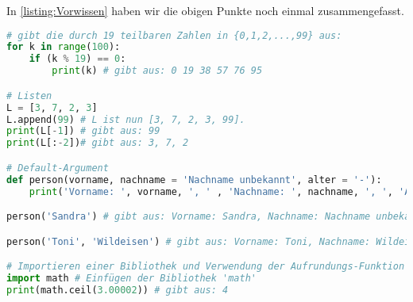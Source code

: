 In \cref{listing:Vorwissen} haben wir die obigen Punkte noch einmal zusammengefasst.
\begin{lstlisting}[language=Python,caption=Vorwissen Python,label=listing:Vorwissen]
# gibt die durch 19 teilbaren Zahlen in {0,1,2,...,99} aus:
for k in range(100):
    if (k % 19) == 0:
        print(k) # gibt aus: 0 19 38 57 76 95

# Listen
L = [3, 7, 2, 3]
L.append(99) # L ist nun [3, 7, 2, 3, 99].
print(L[-1]) # gibt aus: 99
print(L[:-2])# gibt aus: 3, 7, 2

# Default-Argument
def person(vorname, nachname = 'Nachname unbekannt', alter = '-'):
    print('Vorname: ', vorname, ', ' , 'Nachname: ', nachname, ', ', 'Alter: ', alter, sep='')

person('Sandra') # gibt aus: Vorname: Sandra, Nachname: Nachname unbekannt, Alter: -

person('Toni', 'Wildeisen') # gibt aus: Vorname: Toni, Nachname: Wildeisen, Alter: -

# Importieren einer Bibliothek und Verwendung der Aufrundungs-Funktion
import math # Einfügen der Bibliothek 'math'
print(math.ceil(3.00002)) # gibt aus: 4
\end{lstlisting}